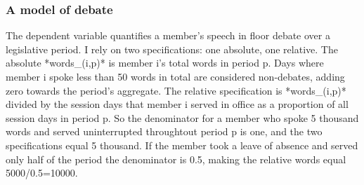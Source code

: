 \documentclass[letter,12pt]{article}
\begin{document}









    \subsubsection{A model of debate}
  
The dependent variable quantifies a member's speech in floor debate over a legislative period. I rely on two specifications: one absolute, one relative. The absolute *words_(i,p)* is member i's total words in period p. Days where member i spoke less than 50 words in total are considered non-debates, adding zero towards the period's aggregate. The relative specification is *words_(i,p)* divided by the session days that member i served in office as a proportion of all session days in period p. So the denominator for a member who spoke 5 thousand words and served uninterrupted throughtout period p is one, and the two specifications equal 5 thousand. If the member took a leave of absence and served only half of the period the denominator is 0.5, making the relative words equal 5000/0.5=10000.  
\end{document}
